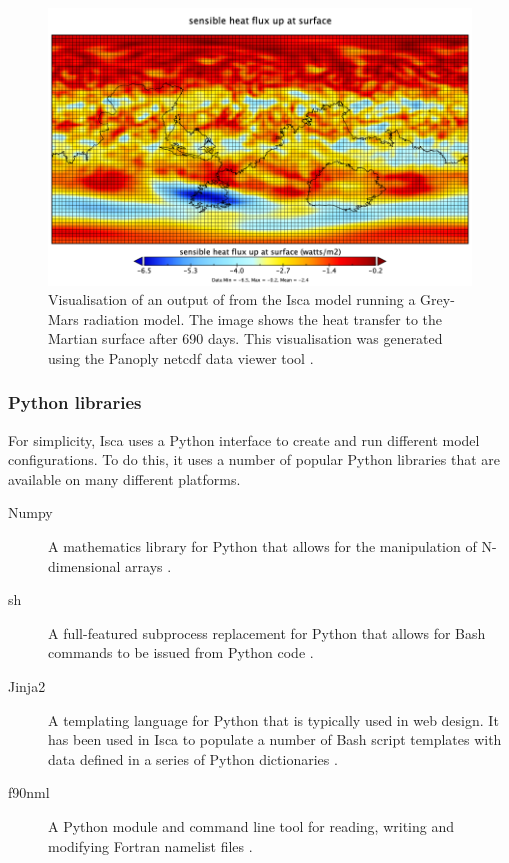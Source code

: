 \documentclass[a4paper,11pt]{report}
\begin{document}
\begin{figure}[htbp]
\begin{center}
\includegraphics[width=\textwidth]{img/flux_t_in_atmos_daily.png}
\caption[Visual output from the Isca model]{Visualisation of an output of from the Isca model running a Grey-Mars radiation model. The image shows the heat transfer to the Martian surface after 690 days. This visualisation was generated using the Panoply \gls{netcdf} data viewer tool \cite{schmunk2015panoply}.}
\label{fig:netcdf}
\end{center}
\end{figure}

\subsubsection{Python libraries}
For simplicity, Isca uses a Python interface to create and run different model configurations. To do this, it uses a number of popular Python libraries that are available on many different platforms.

\begin{description}
	\item[Numpy] A mathematics library for Python that allows for the manipulation of N-dimensional arrays \cite{van2011numpy}.
	
	\item[sh] A full-featured subprocess replacement for Python that allows for Bash commands to be issued from Python code \cite{moffat2017sh}. 
	
	\item[Jinja2] A templating language for Python that is typically used in web design. It has been used in Isca to populate a number of Bash script templates with data defined in a series of Python dictionaries \cite{ronacher2008jinja2}. 
	
	\item[f90nml] A Python module and command line tool for reading, writing and modifying Fortran namelist files \cite{wardf90nml}. 
	
\end{description}
\end{document}
